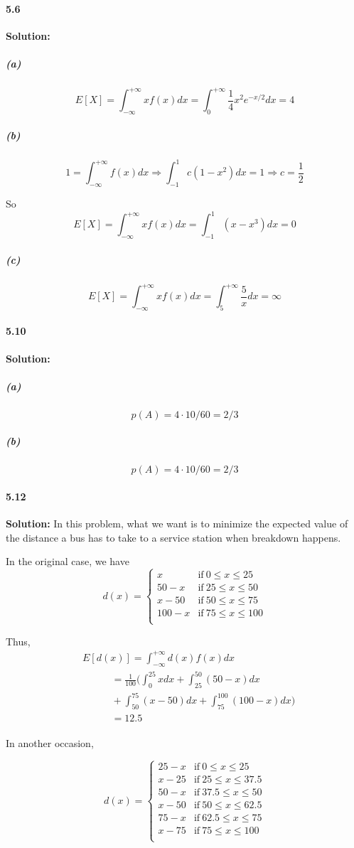 \documentclass[11pt]{article}
\begin{document}
	\paragraph{5.6}\textbf{Solution:}
		\subparagraph{(a)}
			\[E[X] = \int^{+\infty}_{-\infty}xf(x)dx = \int^{+\infty}_{0} \frac{1}{4}x^2e^{-x/2}dx = 4\]
		\subparagraph{(b)}
			\[1 = \int^{+\infty}_{-\infty}f(x)dx \Rightarrow \int^{1}_{-1}c(1 - x^2)dx = 1 \Rightarrow c = \frac{1}{2}\]
			
			So
			\[E[X] = \int^{+\infty}_{-\infty}xf(x)dx = \int^{1}_{-1}(x- x^3)dx = 0\]
		\subparagraph{(c)}
			\[E[X] = \int^{+\infty}_{-\infty}xf(x)dx = \int^{+\infty}_{5}\frac{5}{x}dx = \infty\]
	\paragraph{5.10}\textbf{Solution:}
		\subparagraph{(a)}
			\[p(A) = 4 \cdot 10 / 60 = 2/3\]
		\subparagraph{(b)}
			\[p(A) = 4 \cdot 10 / 60 = 2/3\]
	\paragraph{5.12}\textbf{Solution:}
		In this problem, what we want is to minimize the expected value of the distance a bus has to take to a service station when breakdown happens.
		
		In the original case, we have
			\[d(x) = \left\{\begin{array}{cl}
				x & \mathrm{if\ }0 \leq x \leq 25\\
				50 - x & \mathrm{if\ }25 \leq x \leq 50\\
				x - 50 & \mathrm{if\ }50 \leq x \leq 75\\
				100 - x & \mathrm{if\ }75 \leq x \leq 100\\
			\end{array} \right.\]
			
		Thus, 
		\begin{align}
			&E[d(x)] = \int^{+\infty}_{-\infty}d(x)f(x)dx\nonumber\\
			&\phantom{E[X]} = \frac{1}{100}(\int_0^{25}xdx + \int_{25}^{50}(50 - x)dx\nonumber\\
			&\phantom{E[X]}+ \int_{50}^{75}(x - 50)dx + \int_{75}^{100}(100 -x)dx)\nonumber\\
			&\phantom{E[X]} = 12.5\nonumber
		\end{align}
		
		In another occasion, 
		
			\[d(x) = \left\{\begin{array}{cl}
				25 - x & \mathrm{if\ }0 \leq x \leq 25\\
				x - 25 & \mathrm{if\ }25 \leq x \leq 37.5\\
				50 - x & \mathrm{if\ }37.5 \leq x \leq 50\\
				x - 50 & \mathrm{if\ }50 \leq x \leq 62.5\\
				75 - x & \mathrm{if\ }62.5 \leq x \leq 75\\
				x - 75 & \mathrm{if\ }75 \leq x \leq 100\\
			\end{array} \right.\]
			
\end{document}
